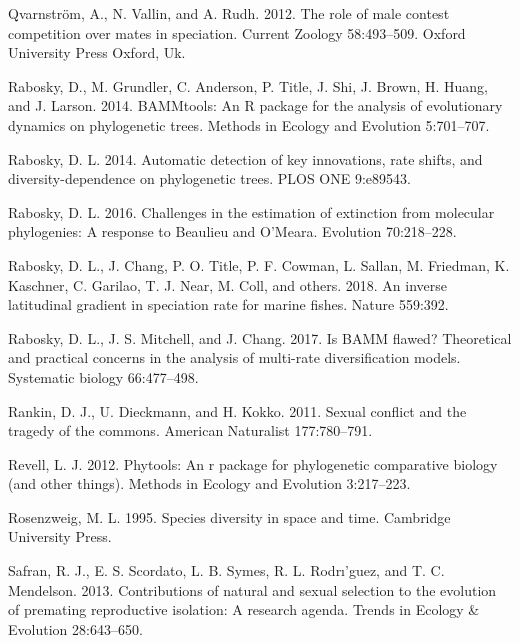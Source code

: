 \documentclass[]{article}
\begin{document}
\leavevmode\hypertarget{ref-Qvarnstrom_2012}{}%
Qvarnström, A., N. Vallin, and A. Rudh. 2012. The role of male contest
competition over mates in speciation. Current Zoology 58:493--509.
Oxford University Press Oxford, Uk.

\leavevmode\hypertarget{ref-bammtools_2014}{}%
Rabosky, D., M. Grundler, C. Anderson, P. Title, J. Shi, J. Brown, H.
Huang, and J. Larson. 2014. BAMMtools: An R package for the analysis of
evolutionary dynamics on phylogenetic trees. Methods in Ecology and
Evolution 5:701--707.

\leavevmode\hypertarget{ref-Rabosky_2014}{}%
Rabosky, D. L. 2014. Automatic detection of key innovations, rate
shifts, and diversity-dependence on phylogenetic trees. PLOS ONE
9:e89543.

\leavevmode\hypertarget{ref-Rabosky_Extinction_2016}{}%
Rabosky, D. L. 2016. Challenges in the estimation of extinction from
molecular phylogenies: A response to Beaulieu and O'Meara. Evolution
70:218--228.

\leavevmode\hypertarget{ref-Rabosky_fish_2018}{}%
Rabosky, D. L., J. Chang, P. O. Title, P. F. Cowman, L. Sallan, M.
Friedman, K. Kaschner, C. Garilao, T. J. Near, M. Coll, and others.
2018. An inverse latitudinal gradient in speciation rate for marine
fishes. Nature 559:392.

\leavevmode\hypertarget{ref-Rabosky_BAMM_flawed_2017}{}%
Rabosky, D. L., J. S. Mitchell, and J. Chang. 2017. Is BAMM flawed?
Theoretical and practical concerns in the analysis of multi-rate
diversification models. Systematic biology 66:477--498.

\leavevmode\hypertarget{ref-Rankin_2011}{}%
Rankin, D. J., U. Dieckmann, and H. Kokko. 2011. Sexual conflict and the
tragedy of the commons. American Naturalist 177:780--791.

\leavevmode\hypertarget{ref-phytools_2012}{}%
Revell, L. J. 2012. Phytools: An r package for phylogenetic comparative
biology (and other things). Methods in Ecology and Evolution 3:217--223.

\leavevmode\hypertarget{ref-Rosenzweig_1995}{}%
Rosenzweig, M. L. 1995. Species diversity in space and time. Cambridge
University Press.

\leavevmode\hypertarget{ref-Safran_2013}{}%
Safran, R. J., E. S. Scordato, L. B. Symes, R. L. Rodrı'guez, and T. C.
Mendelson. 2013. Contributions of natural and sexual selection to the
evolution of premating reproductive isolation: A research agenda. Trends
in Ecology \& Evolution 28:643--650.
\end{document}
